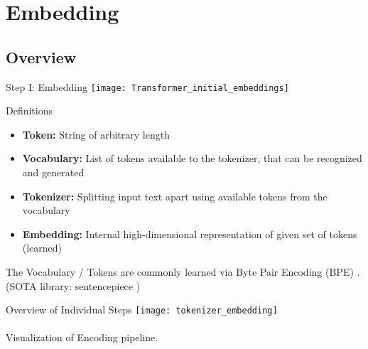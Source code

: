 \section{Embedding}
\subsection{Overview}
\begin{frame}[c]{Step I: Embedding}
    \texttt{[image: Transformer\_initial\_embeddings]}
\end{frame}


\begin{frame}[c]{Definitions}
    \large
    \begin{itemize}[<+(1)->]
        \item    \textbf{Token:} String of arbitrary length
        \item    \textbf{Vocabulary:} List of tokens available to the tokenizer, that can be recognized and generated \\
        \item    \textbf{Tokenizer:} Splitting input text apart using available tokens from the vocabulary \\
        \item    \textbf{Embedding:} Internal high-dimensional representation of given set of tokens (learned) \\
    \end{itemize}
    \pause
    The Vocabulary / Tokens are commonly learned via Byte Pair
    Encoding (BPE) \cite{shibata_byte_1999}. \\
    \pause
    \small (SOTA library: sentencepiece \cite{kudo_sentencepiece_2018})
\end{frame}


\begin{frame}[c]{Overview of Individual Steps}
    \texttt{[image: tokenizer\_embedding]} \\
     \\
    \large
    Visualization of Encoding pipeline.
\end{frame}

